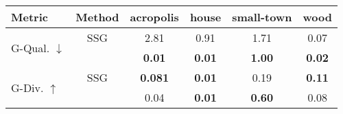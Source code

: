 \begin{tabular}{ l |c|  c  c  c  c }\toprule
Metric & Method & acropolis  & house & small-town & wood \\\midrule

\multirow{2}{*}{G-Qual. $\downarrow$} & SSG  &  2.81 & 0.91 & 1.71 & 0.07 \\
&\ourmethod{}  &  \textbf{0.01}   & \textbf{0.01}   &    \textbf{1.00}   &  \textbf{0.02}\\

\midrule
\multirow{2}{*}{G-Div. $\uparrow$} & SSG  &  \textbf{0.081}   &    \textbf{0.01}   &    0.19   &    \textbf{0.11}   \\
&\ourmethod{}  &  0.04   &    \textbf{0.01}    &   \textbf{0.60}   &     0.08 \\

\bottomrule

\end{tabular}

